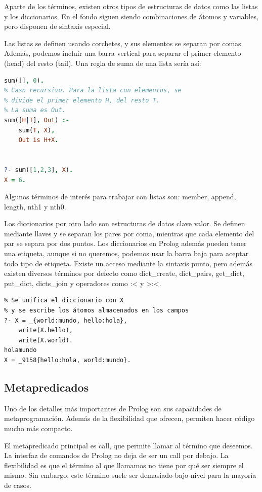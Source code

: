 \documentclass[12pt]{report} %
\begin{document}
Aparte de los términos, existen otros tipos de estructuras de datos como las listas y los diccionarios. En el fondo siguen siendo combinaciones de átomos y variables, pero disponen de sintaxis especial.

Las listas se definen usando corchetes, y sus elementos se separan por comas. Además, podemos incluir una barra vertical para separar el primer elemento (head) del resto (tail). Una regla de suma de una lista sería así:

\begin{lstlisting}[language=Prolog]
% Caso base. Para la lista vacía, la suma es 0
sum([], 0).
% Caso recursivo. Para la lista con elementos, se
% divide el primer elemento H, del resto T.
% La suma es Out.
sum([H|T], Out) :-
    sum(T, X),
    Out is H+X.


?- sum([1,2,3], X).
X = 6.
\end{lstlisting}

Algunos términos de interés para trabajar con listas son: member, append, length, nth1 y nth0.

Los diccionarios por otro lado son estructuras de datos clave valor. Se definen mediante llaves y se separan los pares por coma, mientras que cada elemento del par se separa por dos puntos. Los diccionarios en Prolog además pueden tener una etiqueta, aunque si no queremos, podemos usar la barra baja para aceptar todo tipo de etiqueta. Existe un acceso mediante la sintaxis punto, pero además existen diversos términos por defecto como dict\_create, dict\_pairs, get\_dict, put\_dict, dicts\_join y operadores como :< y >:<.

\begin{lstlisting}
% Se unifica el diccionario con X
% y se escribe los átomos almacenados en los campos 
?- X = _{world:mundo, hello:hola}, 
    write(X.hello), 
    write(X.world).
holamundo
X = _9158{hello:hola, world:mundo}.
\end{lstlisting}

\subsection{Metapredicados}

Uno de los detalles más importantes de Prolog son sus capacidades de metaprogramación. Además de la flexibilidad que ofrecen, permiten hacer código mucho más compacto.

El metapredicado principal es call, que permite llamar al término que deseemos. La interfaz de comandos de Prolog no deja de ser un call por debajo. La flexibilidad es que el término al que llamamos no tiene por qué ser siempre el mismo. Sin embargo, este término suele ser demasiado bajo nivel para la mayoría de casos.
\end{document}
